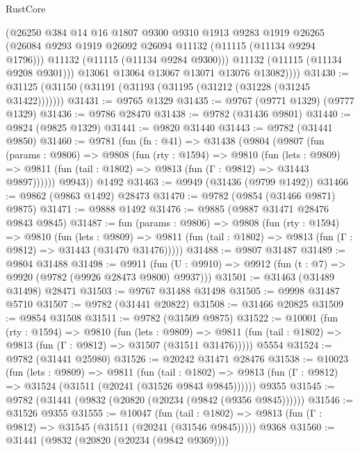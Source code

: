 \begin{lexlean}{RustCore}
\begin{coremodule}
              (@26250
                @384
                @14
                @16
                @1807
                @9300
                @9310
                @1913
                @9283
                @1919
                @26265
                (@26084 @9293 @1919 @26092 @26094 @11132 (@11115 (@11134 @9294 @1796)))
                @11132
                (@11115 (@11134 @9284 @9300)))
              @11132
              (@11115 (@11134 @9208 @9301)))
            @13061
            @13064
            @13067
            @13071
            @13076
            @13082))))
@31430 := @31125 (@31150 (@31191 (@31193 (@31195 (@31212 (@31228 (@31245 @31422)))))))
@31431 := @9765 @1329
@31435 := @9767 (@9771 @1329) (@9777 @1329)
@31436 := @9786 @28470
@31438 := @9782 (@31436 @9801)
@31440 := @9824 (@9825 @1329)
@31441 := @9820 @31440
@31443 := @9782 (@31441 @9850)
@31460 := @9781
    (fun (fn : @41) =>
    @31438
      (@9804
        (@9807
          (fun (params : @9806) =>
          @9808
            (fun (rty : @1594) =>
            @9810
              (fun (lets : @9809) =>
              @9811 (fun (tail : @1802) => @9813 (fun (Γ : @9812) => @31443 @9897))))))
        @9943))
    @1492
@31463 := @9949 (@31436 (@9799 @1492))
@31466 := @9862 (@9863 @1492) @28473
@31470 := @9782 (@9854 (@31466 @9871) @9875)
@31471 := @9888 @1492
@31476 := @9885 (@9887 @31471 @28476 @9843 @9845)
@31487 := fun (params : @9806) =>
  @9808
    (fun (rty : @1594) =>
    @9810
      (fun (lets : @9809) =>
      @9811 (fun (tail : @1802) => @9813 (fun (Γ : @9812) => @31443 (@31470 @31476)))))
@31488 := @9807 @31487
@31489 := @9804 @31488
@31498 := @9911
    (fun (U : @9910) => @9912 (fun (t : @7) => @9920 (@9782 (@9926 @28473 @9800) @9937)))
@31501 := @31463 (@31489 @31498) @28471
@31503 := @9767 @31488 @31498
@31505 := @9998 @31487 @5710
@31507 := @9782 (@31441 @20822)
@31508 := @31466 @20825
@31509 := @9854 @31508
@31511 := @9782 (@31509 @9875)
@31522 := @10001
    (fun (rty : @1594) =>
    @9810
      (fun (lets : @9809) =>
      @9811 (fun (tail : @1802) => @9813 (fun (Γ : @9812) => @31507 (@31511 @31476)))))
    @5554
@31524 := @9782 (@31441 @25980)
@31526 := @20242 @31471 @28476
@31538 := @10023
    (fun (lets : @9809) =>
    @9811
      (fun (tail : @1802) =>
      @9813 (fun (Γ : @9812) => @31524 (@31511 (@20241 (@31526 @9843 @9845))))))
    @9355
@31545 := @9782 (@31441 (@9832 (@20820 (@20234 (@9842 (@9356 @9845))))))
@31546 := @31526 @9355
@31555 := @10047
    (fun (tail : @1802) => @9813 (fun (Γ : @9812) => @31545 (@31511 (@20241 (@31546 @9845)))))
    @9368
@31560 := @31441 (@9832 (@20820 (@20234 (@9842 @9369))))

\end{coremodule}
\end{lexlean}
